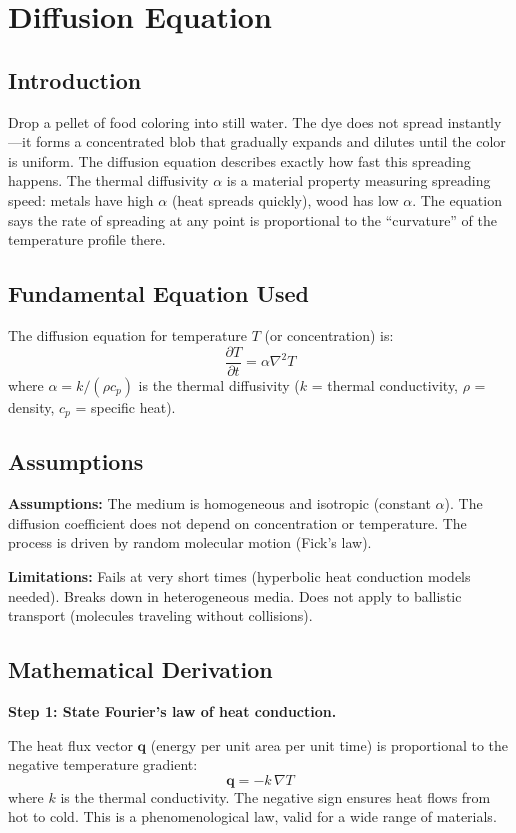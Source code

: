 \chapter{Diffusion Equation}

\section*{Introduction}

Drop a pellet of food coloring into still water. The dye does not spread instantly---it forms a concentrated blob that gradually expands and dilutes until the color is uniform. The diffusion equation describes exactly how fast this spreading happens. The thermal diffusivity $\alpha$ is a material property measuring spreading speed: metals have high $\alpha$ (heat spreads quickly), wood has low $\alpha$. The equation says the rate of spreading at any point is proportional to the ``curvature'' of the temperature profile there.
\section*{Fundamental Equation Used}

The diffusion equation for temperature $T$ (or concentration) is:
\[
\frac{\partial T}{\partial t} = \alpha \nabla^2 T
\]
where $\alpha = k/(\rho c_p)$ is the thermal diffusivity ($k$ = thermal conductivity, $\rho$ = density, $c_p$ = specific heat).
\section*{Assumptions}

\textbf{Assumptions:} The medium is homogeneous and isotropic (constant $\alpha$). The diffusion coefficient does not depend on concentration or temperature. The process is driven by random molecular motion (Fick's law).


\textbf{Limitations:} Fails at very short times (hyperbolic heat conduction models needed). Breaks down in heterogeneous media. Does not apply to ballistic transport (molecules traveling without collisions).


\section*{Mathematical Derivation}

\textbf{Step 1: State Fourier's law of heat conduction.}

The heat flux vector $\mathbf{q}$ (energy per unit area per unit time) is proportional to the negative temperature gradient:
\begin{equation}
\mathbf{q} = -k\,\nabla T
\end{equation}
where $k$ is the thermal conductivity. The negative sign ensures heat flows from hot to cold. This is a phenomenological law, valid for a wide range of materials.

